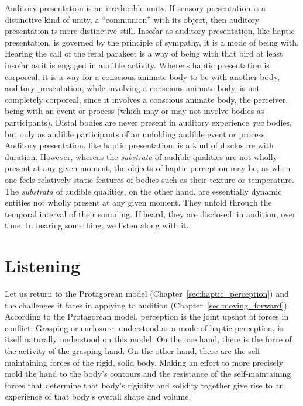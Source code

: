 Auditory presentation is an irreducible unity. If sensory presentation is a distinctive kind of unity, a ``communion'' with its object, then auditory presentation is more distinctive still. Insofar as auditory presentation, like haptic presentation, is governed by the principle of sympathy, it is a mode of being with. Hearing the call of the feral parakeet is a way of being with that bird at least insofar as it is engaged in audible activity. Whereas haptic presentation is corporeal, it is a way for a conscious animate body to be with another body, auditory presentation, while involving a conscious animate body, is not completely corporeal, since it involves a conscious animate body, the perceiver, being with an event or process (which may or may not involve bodies as participants). Distal bodies are never present in auditory experience \emph{qua} bodies, but only as audible participants of an unfolding audible event or process. Auditory presentation, like haptic presentation, is a kind of disclosure with duration. However, whereas the \emph{substrata} of audible qualities are not wholly present at any given moment, the objects of haptic perception may be, as when one feels relatively static features of bodies such as their texture or temperature. The \emph{substrata} of audible qualities, on the other hand, are essentially dynamic entities not wholly present at any given moment. They unfold through the temporal interval of their sounding. If heard, they are disclosed, in audition, over time. In hearing something, we listen along with it.


\section{Listening} %
\label{sec:listening}

Let us return to the Protagorean model (Chapter~\ref{sec:haptic_perception}) and the challenges it faces in applying to audition (Chapter~\ref{sec:moving_forward}). According to the Protagorean model, perception is the joint upshot of forces in conflict. Grasping or enclosure, understood as a mode of haptic perception, is itself naturally understood on this model. On the one hand, there is the force of the activity of the grasping hand. On the other hand, there are the self-maintaining forces of the rigid, solid body. Making an effort to more precisely mold the hand to the body's contours and the resistance of the self-maintaining forces that determine that body's rigidity and solidity together give rise to an experience of that body's overall shape and volume. 

